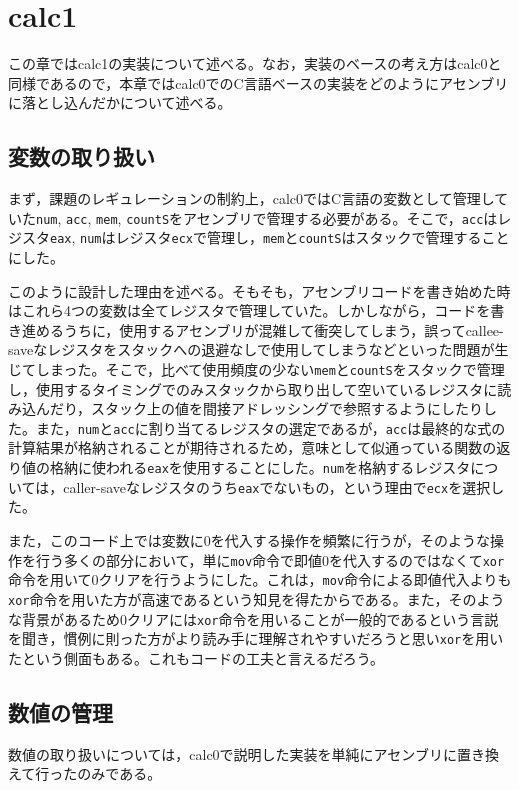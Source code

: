 \documentclass[a4paper]{jsarticle}
\newcommand{\var}[1]{\texttt{#1}}
\begin{document}
\section{calc1}
この章ではcalc1の実装について述べる。なお，実装のベースの考え方はcalc0と同様であるので，本章ではcalc0でのC言語ベースの実装をどのようにアセンブリに落とし込んだかについて述べる。

\subsection{変数の取り扱い}
まず，課題のレギュレーションの制約上，calc0ではC言語の変数として管理していた\var{num}, \var{acc}, \var{mem}, \var{countS}をアセンブリで管理する必要がある。そこで，\var{acc}はレジスタ\var{eax}, \var{num}はレジスタ\var{ecx}で管理し，\var{mem}と\var{countS}はスタックで管理することにした。

このように設計した理由を述べる。そもそも，アセンブリコードを書き始めた時はこれら4つの変数は全てレジスタで管理していた。しかしながら，コードを書き進めるうちに，使用するアセンブリが混雑して衝突してしまう，誤ってcallee-saveなレジスタをスタックへの退避なしで使用してしまうなどといった問題が生じてしまった。そこで，比べて使用頻度の少ない\var{mem}と\var{countS}をスタックで管理し，使用するタイミングでのみスタックから取り出して空いているレジスタに読み込んだり，スタック上の値を間接アドレッシングで参照するようにしたりした。また，\var{num}と\var{acc}に割り当てるレジスタの選定であるが，\var{acc}は最終的な式の計算結果が格納されることが期待されるため，意味として似通っている関数の返り値の格納に使われる\var{eax}を使用することにした。\var{num}を格納するレジスタについては，caller-saveなレジスタのうち\var{eax}でないもの，という理由で\var{ecx}を選択した。

また，このコード上では変数に0を代入する操作を頻繁に行うが，そのような操作を行う多くの部分において，単に\var{mov}命令で即値0を代入するのではなくて\var{xor}命令を用いて0クリアを行うようにした。これは，\var{mov}命令による即値代入よりも\var{xor}命令を用いた方が高速であるという知見を得たからである。また，そのような背景があるため0クリアには\var{xor}命令を用いることが一般的であるという言説を聞き，慣例に則った方がより読み手に理解されやすいだろうと思い\var{xor}を用いたという側面もある。これもコードの工夫と言えるだろう。

\subsection{数値の管理}
数値の取り扱いについては，calc0で説明した実装を単純にアセンブリに置き換えて行ったのみである。
\end{document}
